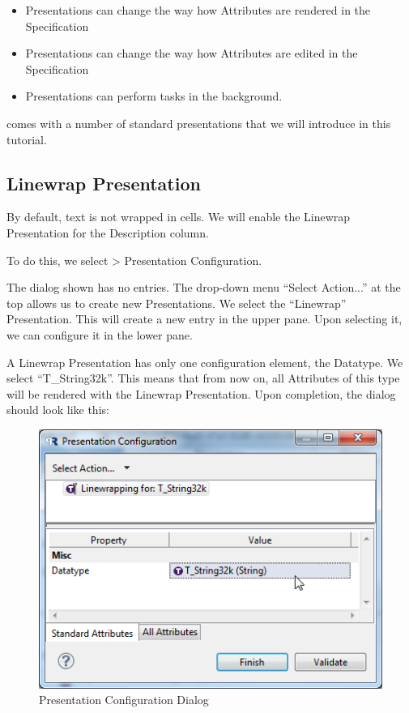 \begin{itemize}
\item
  Presentations can change the way how Attributes are rendered in the
  Specification
\item
  Presentations can change the way how Attributes are edited in the
  Specification
\item
  Presentations can perform tasks in the background.
\end{itemize}

\pror{} comes with a number of standard presentations that we will
introduce in this tutorial.

\subsection{Linewrap Presentation}

By default, text is not wrapped in cells. We will enable the Linewrap
Presentation for the Description column.

To do this, we select \pror{} \textgreater{} Presentation Configuration.

The dialog shown has no entries. The drop-down menu ``Select Action...''
at the top allows us to create new Presentations. We select the
``Linewrap'' Presentation. This will create a new entry in the upper
pane. Upon selecting it, we can configure it in the lower pane.

A Linewrap Presentation has only one configuration element, the
Datatype. We select ``T\_String32k''. This means that from now on, all
Attributes of this type will be rendered with the Linewrap Presentation.
Upon completion, the dialog should look like this:

\begin{figure}[h!]
\centering
\includegraphics[width=0.8\linewidth]{../rmf-images/pror_presentation_configuration.png}      
\caption{Presentation Configuration Dialog}      
\label{fig:presentationConfig}
\end{figure}

